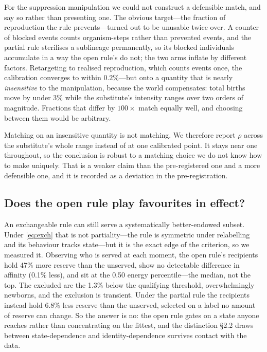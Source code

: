 For the suppression manipulation we could not construct a defensible
match, and say so rather than presenting one. The obvious target---the
fraction of reproduction the rule prevents---turned out to be unusable
twice over. A counter of blocked events counts organism-steps rather
than prevented events, and the partial rule sterilises a sublineage
permanently, so its blocked individuals accumulate in a way the open
rule's do not; the two arms inflate by different factors. Retargeting to
realised reproduction, which counts events once, the calibration
converges to within $0.2\%$---but onto a quantity that is nearly
\emph{insensitive} to the manipulation, because the world compensates:
total births move by under $3\%$ while the substitute's intensity
ranges over two orders of magnitude. Fractions that differ by $100\times$
match equally well, and choosing between them would be arbitrary.

Matching on an insensitive quantity is not matching. We therefore report
$\rho$ across the substitute's whole range instead of at one calibrated
point. It stays near one throughout, so the conclusion is robust to a
matching choice we do not know how to make uniquely. That is a weaker
claim than the pre-registered one and a more defensible one, and it is
recorded as a deviation in the pre-registration.

\subsection{Does the open rule play favourites in effect?}

An exchangeable rule can still serve a systematically
better-endowed subset. Under \eqref{eq:exch} that is not
partiality---the rule is symmetric under relabelling and its
behaviour tracks state---but it is the exact edge of the
criterion, so we measured it. Observing who is served at each
moment, the open rule's recipients hold 47\% more reserve than the unserved, show no detectable difference in
affinity (0.1\% less), and sit at the 0.50 energy percentile---the median, not
the top. The excluded are the 1.3\% below the qualifying threshold, overwhelmingly newborns, and
the exclusion is transient.
Under the partial rule the recipients instead hold 6.8\% less reserve than the unserved, selected on
a label no amount of reserve can change.
So the answer is no: the open rule gates on a state anyone
reaches rather than concentrating on the fittest, and the
distinction \S2.2 draws between state-dependence and
identity-dependence survives contact with the data.

